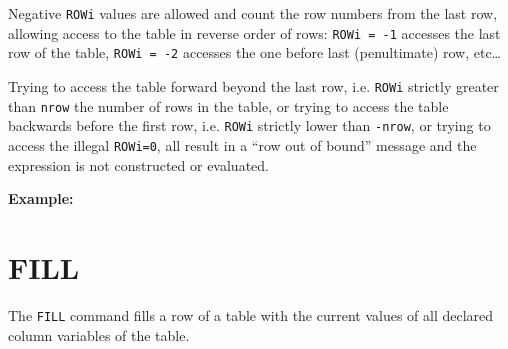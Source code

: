 

Negative \texttt{ROWi} values are allowed and count the row numbers from
the last row, allowing access to the table in reverse order of rows:
\texttt{ROWi~=~-1} accesses the last row of the table,
\texttt{ROWi~=~-2} accesses the one before last (penultimate) row,
etc\ldots  

Trying to access the table forward beyond the last row, i.e. \texttt{ROWi}
strictly greater than {\tt nrow} the number of rows in the table, or
trying to access the table backwards before the first row, i.e. \texttt{ROWi}
strictly lower than {\tt -nrow}, or trying to access the illegal
\texttt{ROWi=0}, all result in a ``row out of bound'' message and the
expression is not constructed or evaluated. 


{\bf Example:}

\section{FILL} 
\label{sec:fill}
The {\tt FILL} command fills a row of a table with the current values 
of all declared column variables of the table.

